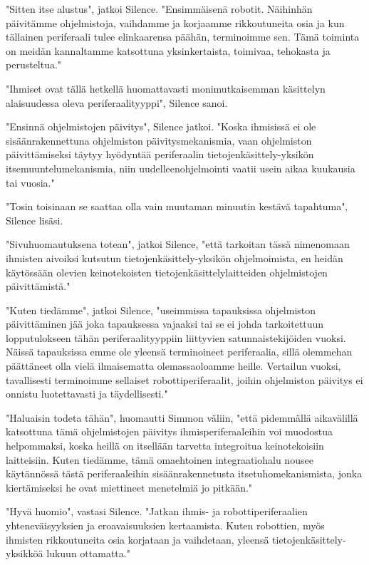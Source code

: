 "Sitten itse alustus", jatkoi Silence. "Ensimmäisenä robotit. Näihinhän päivitämme ohjelmistoja, vaihdamme ja korjaamme rikkoutuneita osia ja kun tällainen periferaali tulee elinkaarensa päähän, terminoimme sen. Tämä toiminta on meidän kannaltamme katsottuna yksinkertaista, toimivaa, tehokasta ja perusteltua."


"Ihmiset ovat tällä hetkellä huomattavasti monimutkaisemman käsittelyn alaisuudessa oleva periferaalityyppi", Silence sanoi.


"Ensinnä ohjelmistojen päivitys", Silence jatkoi. "Koska ihmisissä ei ole sisäänrakennettuna ohjelmiston päivitysmekanismia, vaan ohjelmiston päivittämiseksi täytyy hyödyntää periferaalin tietojenkäsittely-yksikön itsemuuntelumekanismia, niin uudelleenohjelmointi vaatii usein aikaa kuukausia tai vuosia."


"Tosin toisinaan se saattaa olla vain muutaman minuutin kestävä tapahtuma", Silence lisäsi.


"Sivuhuomautuksena totean", jatkoi Silence, "että tarkoitan tässä nimenomaan ihmisten aivoiksi kutsutun tietojenkäsittely-yksikön ohjelmoimista, en heidän käytössään olevien keinotekoisten tietojenkäsittelylaitteiden ohjelmistojen päivittämistä."


"Kuten tiedämme", jatkoi Silence, "useimmissa tapauksissa ohjelmiston päivittäminen jää joka tapauksessa vajaaksi tai se ei johda tarkoitettuun lopputulokseen tähän periferaalityyppiin liittyvien satunnaistekijöiden vuoksi. Näissä tapauksissa emme ole yleensä terminoineet periferaalia, sillä olemmehan päättäneet olla vielä ilmaisematta olemassaoloamme heille. Vertailun vuoksi, tavallisesti terminoimme sellaiset robottiperiferaalit, joihin ohjelmiston päivitys ei onnistu luotettavasti ja täydellisesti."


"Haluaisin todeta tähän", huomautti Simmon väliin, "että pidemmällä aikavälillä katsottuna tämä ohjelmistojen päivitys ihmisperiferaaleihin voi muodostua helpommaksi, koska heillä on itsellään tarvetta integroitua keinotekoisiin laitteisiin. Kuten tiedämme, tämä omaehtoinen integraatiohalu nousee käytännössä tästä periferaaleihin sisäänrakennetusta itsetuhomekanismista, jonka kiertämiseksi he ovat miettineet menetelmiä jo pitkään."


"Hyvä huomio", vastasi Silence. "Jatkan ihmis- ja robottiperiferaalien yhteneväisyyksien ja eroavaisuuksien kertaamista. Kuten robottien, myös ihmisten rikkoutuneita osia korjataan ja vaihdetaan, yleensä tietojenkäsittely-yksikköä lukuun ottamatta."


